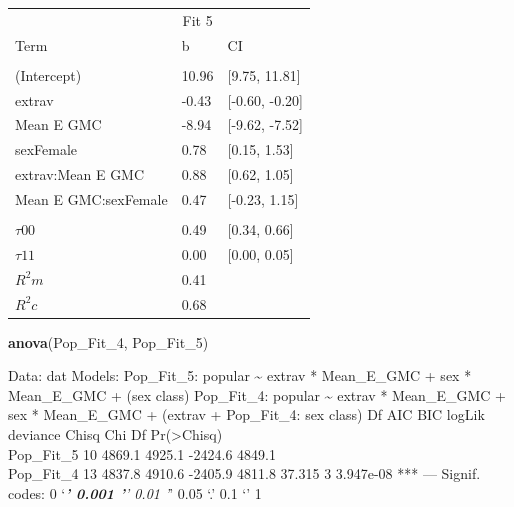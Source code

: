 \documentclass[]{article}
\newenvironment{Shaded}{\begin{snugshade}}{\end{snugshade}}
\newcommand{\KeywordTok}[1]{\textcolor[rgb]{0.13,0.29,0.53}{\textbf{#1}}}
\newcommand{\DecValTok}[1]{\textcolor[rgb]{0.00,0.00,0.81}{#1}}
\newcommand{\NormalTok}[1]{#1}
\begin{document}
\begin{tabular}{lll}
\toprule
\multicolumn{1}{c}{ } & \multicolumn{1}{c}{Fit 5} \\
\cmidrule(l{2pt}r{2pt}){2-2}
Term & b & CI\\
\midrule
\addlinespace[0.3em]
\multicolumn{3}{l}{\textbf{Fixed}}\\
\hspace{1em}(Intercept) & 10.96 & [9.75, 11.81]\\
\hspace{1em}extrav & -0.43 & [-0.60, -0.20]\\
\hspace{1em}Mean E GMC & -8.94 & [-9.62, -7.52]\\
\hspace{1em}sexFemale & 0.78 & [0.15, 1.53]\\
\hspace{1em}extrav:Mean E GMC & 0.88 & [0.62, 1.05]\\
\hspace{1em}Mean E GMC:sexFemale & 0.47 & [-0.23, 1.15]\\
\addlinespace[0.3em]
\multicolumn{3}{l}{\textbf{Random}}\\
\hspace{1em}$\tau {00}$ & 0.49 & [0.34, 0.66]\\
\hspace{1em}$\tau {11}$ & 0.00 & [0.00, 0.05]\\
$R^2 m$ & 0.41 & \\
$R^2 c$ & 0.68 & \\
\bottomrule
\end{tabular}

\begin{Shaded}
\begin{Highlighting}[]
\KeywordTok{anova}\NormalTok{(Pop_Fit_}\DecValTok{4}\NormalTok{, Pop_Fit_}\DecValTok{5}\NormalTok{)}
\end{Highlighting}
\end{Shaded}

Data: dat Models: Pop\_Fit\_5: popular \textasciitilde{} extrav *
Mean\_E\_GMC + sex * Mean\_E\_GMC + (sex \textbar{} class) Pop\_Fit\_4:
popular \textasciitilde{} extrav * Mean\_E\_GMC + sex * Mean\_E\_GMC +
(extrav + Pop\_Fit\_4: sex \textbar{} class) Df AIC BIC logLik deviance
Chisq Chi Df Pr(\textgreater{}Chisq)\\
Pop\_Fit\_5 10 4869.1 4925.1 -2424.6 4849.1\\
Pop\_Fit\_4 13 4837.8 4910.6 -2405.9 4811.8 37.315 3 3.947e-08 *** ---
Signif. codes: 0 `\emph{\textbf{' 0.001 '}' 0.01 '}' 0.05 `.' 0.1 `' 1
\end{document}
